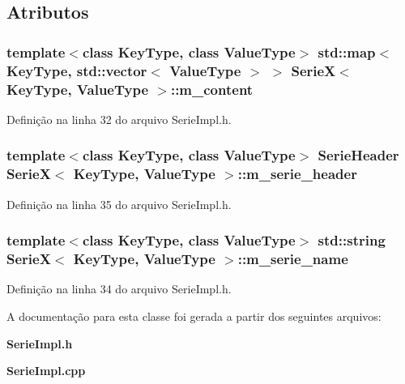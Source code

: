 \subsection{Atributos}
\subsubsection[{m\+\_\+content}]{\setlength{\rightskip}{0pt plus 5cm}template$<$class Key\+Type, class Value\+Type$>$ std\+::map$<$ Key\+Type, std\+::vector$<$ Value\+Type $>$ $>$ {\bf SerieX}$<$ Key\+Type, Value\+Type $>$\+::m\+\_\+content\hspace{0.3cm}{\ttfamily [protected]}}\label{class_serie_x_aade7e95c5fdce162a995bc019bdc5c5a}


Definição na linha 32 do arquivo Serie\+Impl.\+h.

\subsubsection[{m\+\_\+serie\+\_\+header}]{\setlength{\rightskip}{0pt plus 5cm}template$<$class Key\+Type, class Value\+Type$>$ {\bf Serie\+Header} {\bf SerieX}$<$ Key\+Type, Value\+Type $>$\+::m\+\_\+serie\+\_\+header\hspace{0.3cm}{\ttfamily [protected]}}\label{class_serie_x_aba9460f5fe9c870169b82b13a1aac104}


Definição na linha 35 do arquivo Serie\+Impl.\+h.

\subsubsection[{m\+\_\+serie\+\_\+name}]{\setlength{\rightskip}{0pt plus 5cm}template$<$class Key\+Type, class Value\+Type$>$ std\+::string {\bf SerieX}$<$ Key\+Type, Value\+Type $>$\+::m\+\_\+serie\+\_\+name\hspace{0.3cm}{\ttfamily [protected]}}\label{class_serie_x_a38ba642e7a1c65f7224fb211e10e4ebb}


Definição na linha 34 do arquivo Serie\+Impl.\+h.



A documentação para esta classe foi gerada a partir dos seguintes arquivos\+:\begin{DoxyCompactItemize}
\item 
{\bf Serie\+Impl.\+h}\item 
{\bf Serie\+Impl.\+cpp}\end{DoxyCompactItemize}
